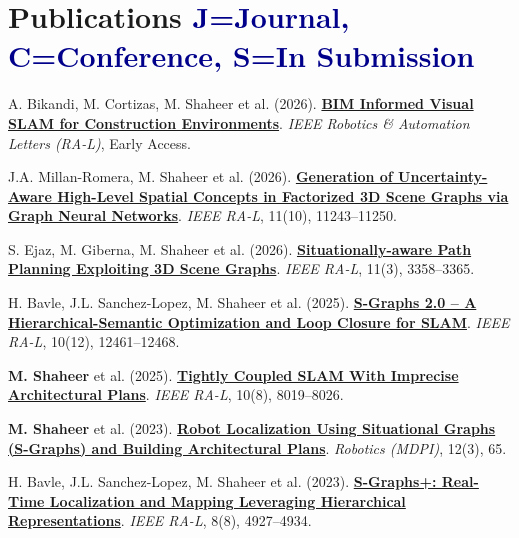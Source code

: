\documentclass[a4paper,11pt]{article}
\begin{document}
\section{\textbf{Publications} \hfill \textcolor{darkblue}{\scriptsize J=Journal, C=Conference, S=In Submission}}
\vspace{0.2mm}
\footnotesize{
\begin{enumerate}[leftmargin=*, labelsep=0.5em, align=left, widest={[\textbf{S.1}]}, itemindent=0em, itemsep=0mm]
\item[\textbf{[J.1]}] A. Bikandi, M. Cortizas, M. Shaheer et al. (2026). \href{https://arxiv.org/abs/2509.13972}{\textbf{BIM Informed Visual SLAM for Construction Environments}}. \textit{IEEE Robotics \& Automation Letters (RA-L)}, Early Access.

\item[\textbf{[J.2]}] J.A. Millan-Romera, M. Shaheer et al. (2026). \href{https://ieeexplore.ieee.org/document/11593144}{\textbf{Generation of Uncertainty-Aware High-Level Spatial Concepts in Factorized 3D Scene Graphs via Graph Neural Networks}}. \textit{IEEE RA-L}, 11(10), 11243--11250.

\item[\textbf{[J.3]}] S. Ejaz, M. Giberna, M. Shaheer et al. (2026). \href{https://ieeexplore.ieee.org/document/11361085}{\textbf{Situationally-aware Path Planning Exploiting 3D Scene Graphs}}. \textit{IEEE RA-L}, 11(3), 3358--3365.

\item[\textbf{[J.4]}] H. Bavle, J.L. Sanchez-Lopez, M. Shaheer et al. (2025). \href{https://ieeexplore.ieee.org/document/11197654}{\textbf{S-Graphs 2.0 -- A Hierarchical-Semantic Optimization and Loop Closure for SLAM}}. \textit{IEEE RA-L}, 10(12), 12461--12468.

\item[\textbf{[J.5]}] \textbf{M. Shaheer} et al. (2025). \href{https://ieeexplore.ieee.org/document/11045969}{\textbf{Tightly Coupled SLAM With Imprecise Architectural Plans}}. \textit{IEEE RA-L}, 10(8), 8019--8026.

\item[\textbf{[J.6]}] \textbf{M. Shaheer} et al. (2023). \href{https://www.mdpi.com/2218-6581/12/3/65}{\textbf{Robot Localization Using Situational Graphs (S-Graphs) and Building Architectural Plans}}. \textit{Robotics (MDPI)}, 12(3), 65.

\item[\textbf{[J.7]}] H. Bavle, J.L. Sanchez-Lopez, M. Shaheer et al. (2023). \href{https://ieeexplore.ieee.org/document/10168233}{\textbf{S-Graphs+: Real-Time Localization and Mapping Leveraging Hierarchical Representations}}. \textit{IEEE RA-L}, 8(8), 4927--4934.


\end{enumerate}}
\end{document}
